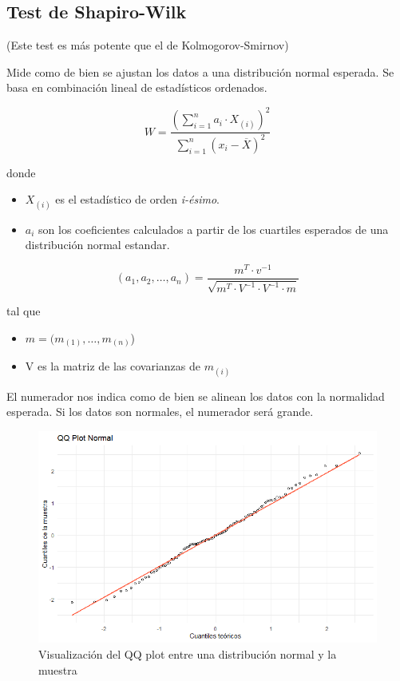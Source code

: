 \subsection{Test de Shapiro-Wilk}
(Este test es más potente que el de Kolmogorov-Smirnov)

Mide como de bien se ajustan los datos a una distribución normal esperada. Se basa en combinación lineal de estadísticos ordenados. %

\[
    W=\frac{\left(\sum_{i=1}^{n} a_i \cdot X_{(i)}\right)^2}{\sum_{i=1}^{n}(x_i-\overline{X})^2}
\]

\noindent donde

\begin{itemize}
    \item $X_{(i)}$ es el estadístico de orden \textit{i-ésimo}.
    \item $a_i$ son los coeficientes calculados a partir de los cuartiles esperados de una distribución normal estandar. 
\end{itemize}

\[
    (a_1,a_2,\dots,a_n)=\frac{m^T\cdot v^{-1}}{\sqrt{m^T \cdot V^{-1} \cdot V^{-1} \cdot m}}
\]

\noindent tal que

\begin{itemize}
    \item $m=(m_{(1)},\dots,m_{(n)}$)
    \item V es la matriz de las covarianzas de $m_{(i)}$
\end{itemize}

El numerador nos indica como de bien se alinean los datos con la normalidad esperada. Si los datos son normales, el numerador será grande.

\begin{figure}[h!]
    \centering
    \includegraphics[width=\textwidth]{assets/Tema4/QQplot.png}
    \caption{Visualización del QQ plot entre una distribución normal y la muestra}
    \label{fig:qqplot_normal}
\end{figure}